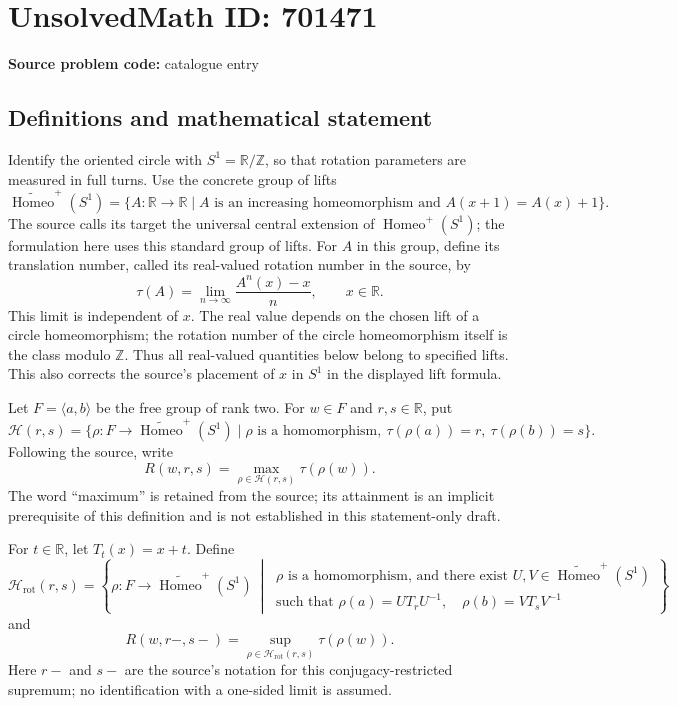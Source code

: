 \documentclass[11pt]{article}
\newcommand{\Z}{\mathbb{Z}}
\newcommand{\R}{\mathbb{R}}
\begin{document}
\section*{UnsolvedMath ID: 701471}
\textbf{Source problem code:} catalogue entry
\subsection{Definitions and mathematical statement}
Identify the oriented circle with \(S^1=\R/\Z\), so that rotation parameters are measured in full turns. Use the concrete group of lifts
\[
\widetilde{\operatorname{Homeo}}^{+}(S^1)
=\{A:\R\to\R\mid A\text{ is an increasing homeomorphism and }A(x+1)=A(x)+1\}.
\]
The source calls its target the universal central extension of \(\operatorname{Homeo}^{+}(S^1)\); the formulation here uses this standard group of lifts. For \(A\) in this group, define its translation number, called its real-valued rotation number in the source, by
\[
\tau(A)=\lim_{n\to\infty}\frac{A^n(x)-x}{n},\qquad x\in\R.
\]
This limit is independent of \(x\). The real value depends on the chosen lift of a circle homeomorphism; the rotation number of the circle homeomorphism itself is the class modulo \(\Z\). Thus all real-valued quantities below belong to specified lifts. This also corrects the source's placement of \(x\) in \(S^1\) in the displayed lift formula.

Let \(F=\langle a,b\rangle\) be the free group of rank two. For \(w\in F\) and \(r,s\in\R\), put
\[
\mathcal H(r,s)=\{\rho:F\to\widetilde{\operatorname{Homeo}}^{+}(S^1)\mid \rho\text{ is a homomorphism},\ \tau(\rho(a))=r,\ \tau(\rho(b))=s\}.
\]
Following the source, write
\[
R(w,r,s)=\max_{\rho\in\mathcal H(r,s)}\tau(\rho(w)).
\]
The word ``maximum'' is retained from the source; its attainment is an implicit prerequisite of this definition and is not established in this statement-only draft.

For \(t\in\R\), let \(T_t(x)=x+t\). Define
\[
\mathcal H_{\mathrm{rot}}(r,s)=\left\{\rho:F\to\widetilde{\operatorname{Homeo}}^{+}(S^1)\ \middle|\ 
\begin{array}{l}
\rho\text{ is a homomorphism, and there exist }U,V\in\widetilde{\operatorname{Homeo}}^{+}(S^1)\\
\text{such that }\rho(a)=UT_rU^{-1},\quad \rho(b)=VT_sV^{-1}
\end{array}\right\}
\]
and
\[
R(w,r-,s-)=\sup_{\rho\in\mathcal H_{\mathrm{rot}}(r,s)}\tau(\rho(w)).
\]
Here \(r-\) and \(s-\) are the source's notation for this conjugacy-restricted supremum; no identification with a one-sided limit is assumed.
\end{document}
